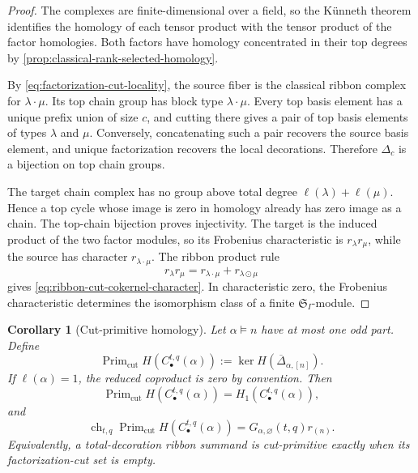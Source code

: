 \documentclass{amsart}
\newtheorem{corollary}[corollary]{Corollary}
\theoremstyle{definition}
\theoremstyle{remark}
\begin{document}
\begin{proof}
The complexes are finite-dimensional over a field, so the K\"unneth theorem
identifies the homology of each tensor product with the tensor product of the
factor homologies.  Both factors have homology concentrated in their top
degrees by \cref{prop:classical-rank-selected-homology}.

By \eqref{eq:factorization-cut-locality}, the source fiber is the classical
ribbon complex for $\lambda\mathbin{\cdot}\mu$.  Its top chain group has block
type $\lambda\mathbin{\cdot}\mu$.  Every top basis element has a unique prefix
union of size $c$, and cutting there gives a pair of top basis elements of
types $\lambda$ and $\mu$.  Conversely, concatenating such a pair recovers the
source basis element, and unique factorization recovers the local decorations.
Therefore $\Delta_c$ is a bijection on top chain groups.

The target chain complex has no group above total degree
$\ell(\lambda)+\ell(\mu)$.  Hence a top cycle whose image is zero in homology
already has zero image as a chain.  The top-chain bijection proves
injectivity.  The target is the induced product of the two factor modules, so
its Frobenius characteristic is $r_\lambda r_\mu$, while the source has
character $r_{\lambda\cdot\mu}$.  The ribbon product rule
\[
 r_\lambda r_\mu
 =r_{\lambda\cdot\mu}+r_{\lambda\odot\mu}
\]
gives \eqref{eq:ribbon-cut-cokernel-character}.  In characteristic zero, the
Frobenius characteristic determines the isomorphism class of a finite
$\mathfrak S_I$-module.
\end{proof}

\begin{corollary}[Cut-primitive homology]
\label{cor:cut-primitive-homology}
Let $\alpha\models n$ have at most one odd part.  Define
\begin{equation}
 \operatorname{Prim}_{\mathrm{cut}}H(C_\bullet^{t,q}(\alpha))
 :=\ker H(\overline\Delta_{\alpha,[n]}).
 \label{eq:cut-primitive-definition}
\end{equation}
If $\ell(\alpha)=1$, the reduced coproduct is zero by convention.  Then
\begin{equation}
 \operatorname{Prim}_{\mathrm{cut}}H(C_\bullet^{t,q}(\alpha))
 =H_1(C_\bullet^{t,q}(\alpha)),
 \label{eq:cut-primitives-equal-h-one}
\end{equation}
and
\begin{equation}
 \operatorname{ch}_{t,q}\operatorname{Prim}_{\mathrm{cut}}
 H(C_\bullet^{t,q}(\alpha))
 =G_{\alpha,\varnothing}(t,q)r_{(n)}.
 \label{eq:cut-primitive-character}
\end{equation}
Equivalently, a total-decoration ribbon summand is cut-primitive exactly when
its factorization-cut set is empty.
\end{corollary}
\end{document}

